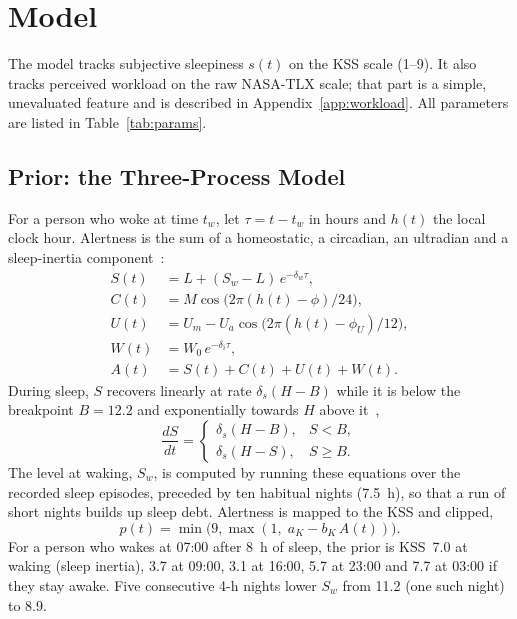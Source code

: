 \section{Model}
\label{sec:model}

The model tracks subjective sleepiness $s(t)$ on the KSS scale (1--9). It also tracks perceived workload on the raw NASA-TLX scale; that part is a simple, unevaluated feature and is described in Appendix~\ref{app:workload}. All parameters are listed in Table~\ref{tab:params}.

\subsection{Prior: the Three-Process Model}
For a person who woke at time $t_w$, let $\tau = t - t_w$ in hours and $h(t)$ the local clock hour. Alertness is the sum of a homeostatic, a circadian, an ultradian and a sleep-inertia component~\cite{akerstedt2004predictions,ingre2014validating}:
\begin{align}
  S(t) &= L + (S_w - L)\,e^{-\delta_w \tau}, \label{eq:S}\\
  C(t) &= M \cos\big(2\pi (h(t) - \phi)/24\big), \\
  U(t) &= U_m - U_a \cos\big(2\pi (h(t) - \phi_U)/12\big), \\
  W(t) &= W_0\, e^{-\delta_i \tau}, \\
  A(t) &= S(t) + C(t) + U(t) + W(t).
\end{align}
During sleep, $S$ recovers linearly at rate $\delta_s (H - B)$ while it is below the breakpoint $B = 12.2$ and exponentially towards $H$ above it~\cite{akerstedt2008accounting,ingre2014validating},
\begin{equation}
  \frac{dS}{dt} = \begin{cases} \delta_s (H - B), & S < B,\\ \delta_s (H - S), & S \geq B. \end{cases}
\end{equation}
The level at waking, $S_w$, is computed by running these equations over the recorded sleep episodes, preceded by ten habitual nights (7.5~h), so that a run of short nights builds up sleep debt. Alertness is mapped to the KSS and clipped,
\begin{equation}
  p(t) = \min\!\big(9, \max(1,\; a_K - b_K\,A(t))\big).
  \label{eq:prior}
\end{equation}
For a person who wakes at 07:00 after 8~h of sleep, the prior is KSS~7.0 at waking (sleep inertia), 3.7 at 09:00, 3.1 at 16:00, 5.7 at 23:00 and 7.7 at 03:00 if they stay awake. Five consecutive 4-h nights lower $S_w$ from 11.2 (one such night) to 8.9.


